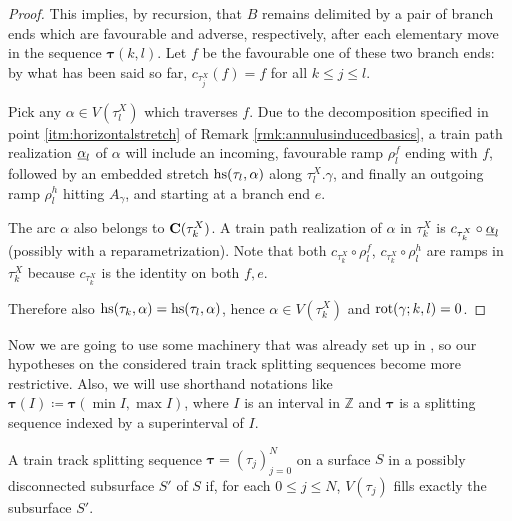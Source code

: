 \begin{proof}
This implies, by recursion, that $B$ remains delimited by a pair of branch ends which are favourable and adverse, respectively, after each elementary move in the sequence $\bm\tau(k,l)$. Let $f$ be the favourable one of these two branch ends: by what has been said so far, $c_{\tau_j^X}(f)=f$ for all $k\leq j\leq l$.

Pick any $\alpha\in V(\tau_l^X)$ which traverses $f$. Due to the decomposition specified in point \ref{itm:horizontalstretch} of Remark \ref{rmk:annulusinducedbasics}, a train path realization $\underline{\alpha}_l$ of $\alpha$ will include an incoming, favourable ramp $\rho_l^f$ ending with $f$, followed by an embedded stretch $\mathrm{hs}(\tau_l,\alpha)$ along $\tau_l^X.\gamma$, and finally an outgoing ramp $\rho_l^h$ hitting $A_{\gamma}$, and starting at a branch end $e$.

The arc $\alpha$ also belongs to $\mathbf C(\tau_k^X)$. A train path realization of $\alpha$ in $\tau_k^{X}$ is $c_{\tau_k^X}\circ\underline{\alpha}_l$ (possibly with a reparametrization). Note that both $c_{\tau_k^X}\circ\rho_l^f$, $c_{\tau_k^X}\circ\rho_l^h$ are ramps in $\tau_k^X$ because $c_{\tau_k^X}$ is the identity on both $f,e$. 

Therefore also $\mathrm{hs}(\tau_k,\alpha)=\mathrm{hs}(\tau_l,\alpha)$, hence $\alpha\in V(\tau_k^{X})$ and $\mathrm{rot}(\gamma;k,l)=0$.
\end{proof}

Now we are going to use some machinery that was already set up in \cite{mms}, so our hypotheses on the considered train track splitting sequences become more restrictive. Also, we will use shorthand notations like $\bm\tau(I)\coloneqq \bm\tau(\min I,\max I)$, where $I$ is an interval in $\mathbb Z$ and $\bm\tau$ is a splitting sequence indexed by a superinterval of $I$.

\begin{defin}
A train track splitting sequence $\bm\tau=(\tau_j)_{j=0}^N$ on a surface $S$  in a possibly disconnected subsurface $S'$ of $S$ if, for each $0\leq j\leq N$, $V(\tau_j)$ fills exactly the subsurface $S'$.
\end{defin}


